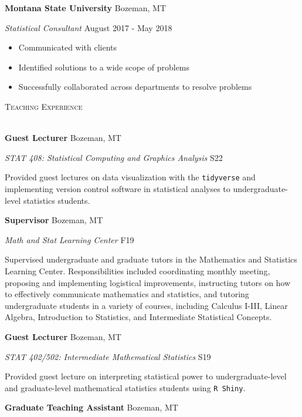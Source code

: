 \documentclass[a4paper]{article}
\newcommand{\lineunder} {
	\vspace*{-8pt} \\
	\hspace*{-18pt} \hrulefill \\
}
\newcommand{\header} [1] {
	{\hspace*{-18pt}\vspace*{6pt} \textsc{#1}}
	\vspace*{-6pt} \lineunder
}
\begin{document}
\textbf{Montana State University} \hfill Bozeman, MT

\textit{Statistical Consultant} \hfill August 2017 - May 2018

\vspace{-1mm}
\begin{itemize} \itemsep 1pt
   \item Communicated with clients
   \item Identified solutions to a wide scope of problems
   \item Successfully collaborated across departments to resolve problems
\end{itemize}

\newpage

\header{Teaching Experience}
\vspace*{2mm}

\textbf{Guest Lecturer} \hfill Bozeman, MT

\emph{STAT 408: Statistical Computing and Graphics Analysis} \hfill S22

Provided guest lectures on data visualization with the
\texttt{tidyverse} and implementing version control software in
statistical analyses to undergraduate-level statistics students.
\vspace*{2mm}

\textbf{Supervisor} \hfill Bozeman, MT

\emph{Math and Stat Learning Center} \hfill F19

Supervised undergraduate and graduate tutors in the Mathematics and
Statistics Learning Center. Responsibilities included coordinating
monthly meeting, proposing and implementing logistical improvements,
instructing tutors on how to effectively communicate mathematics and
statistics, and tutoring undergraduate students in a variety of courses,
including Calculus I-III, Linear Algebra, Introduction to Statistics,
and Intermediate Statistical Concepts.\vspace*{2mm}

\textbf{Guest Lecturer} \hfill Bozeman, MT

\emph{STAT 402/502: Intermediate Mathematical Statistics} \hfill S19

Provided guest lecture on interpreting statistical power to
undergraduate-level and graduate-level mathematical statistics students
using \texttt{R\ Shiny}. \vspace*{2mm}

\textbf{Graduate Teaching Assistant} \hfill Bozeman, MT
\end{document}
